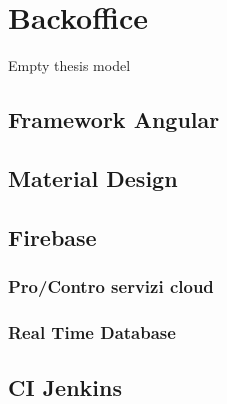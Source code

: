 \chapter{Backoffice}
Empty thesis model

\section{Framework Angular}
\section{Material Design}
\section{Firebase}
\subsection{Pro/Contro servizi cloud}
\subsection{Real Time Database}
\section{CI Jenkins}